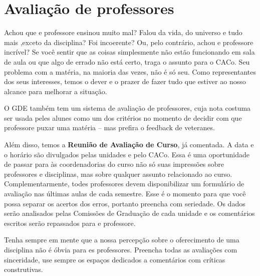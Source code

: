 \section{Avaliação de professores}

Achou que e professore ensinou muito mal? Falou da vida, do universo e tudo mais  ,exceto da disciplina? Foi incoerente? Ou, pelo contrário, achou e professore incrível? Se você sentir que as coisas simplesmente não estão funcionando em sala de aula ou  que algo de errado não está certo, traga o assunto para o CACo. Seu problema com a  matéria, na maioria das vezes, não é só seu. Como representantes dos seus interesses,  temos o dever e o prazer de fazer tudo que estiver ao nosso alcance para melhorar a  situação. 

O GDE também tem um sistema de avaliação de professores, cuja nota costuma ser  usada peles alunes como um dos critérios no momento de decidir com que professore  puxar uma matéria – mas prefira o feedback de veteranes. 

Além disso, temos a \textbf{Reunião de Avaliação de Curso}, já comentada. A data e o horário  são divulgados pelas unidades e pelo CACo. Essa é uma oportunidade de passar para às  coordenadorias do curso não só suas impressões sobre professores e disciplinas, mas  sobre qualquer assunto relacionado ao curso. Complementarmente, todes professores  devem disponibilizar um formulário de avaliação nas últimas aulas de cada semestre.  Esse é o momento para que você possa separar os acertos dos erros, portanto preencha  com seriedade. Os dados serão analisados pelas Comissões de Graduação de cada  unidade e os comentários escritos serão repassados para e professore. 

Tenha sempre em mente que a nossa percepção sobre o oferecimento de uma  disciplina não é óbvia para es professores. Preencha todas as avaliações com  sinceridade, use sempre os espaços dedicados a comentários com críticas construtivas. 
